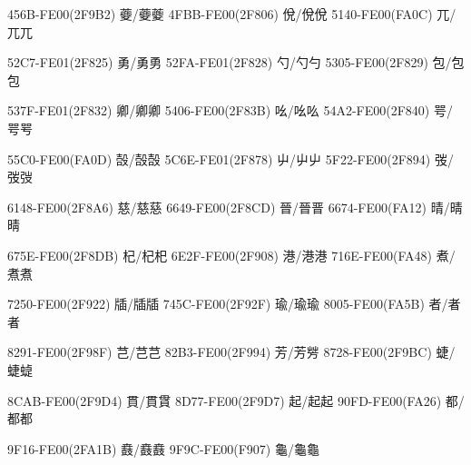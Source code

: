 456B-FE00(2F9B2) 䕫/䕫︀䕫 
4FBB-FE00(2F806) 侻/侻︀侻 
5140-FE00(FA0C) 兀/兀︀兀\par
52C7-FE01(2F825) 勇/勇︁勇 
52FA-FE01(2F828) 勺/勺︁勺 
5305-FE00(2F829) 包/包︀包\par
537F-FE01(2F832) 卿/卿︁卿 
5406-FE00(2F83B) 吆/吆︀吆 
54A2-FE00(2F840) 咢/咢︀咢\par
55C0-FE00(FA0D) 嗀/嗀︀嗀 
5C6E-FE01(2F878) 屮/屮︁屮 
5F22-FE00(2F894) 弢/弢︀弢\par
6148-FE00(2F8A6) 慈/慈︀慈 
6649-FE00(2F8CD) 晉/晉︀晉 
6674-FE00(FA12) 晴/晴︀晴\par
675E-FE00(2F8DB) 杞/杞︀杞 
6E2F-FE00(2F908) 港/港︀港 
716E-FE00(FA48) 煮/煮︀煮\par
7250-FE00(2F922) 牐/牐︀牐 
745C-FE00(2F92F) 瑜/瑜︀瑜 
8005-FE00(FA5B) 者/者︀者\par
8291-FE00(2F98F) 芑/芑︀芑 
82B3-FE00(2F994) 芳/芳︀芳 
8728-FE00(2F9BC) 蜨/蜨︀蜨\par
8CAB-FE00(2F9D4) 貫/貫︀貫 
8D77-FE00(2F9D7) 起/起︀起 
90FD-FE00(FA26) 都/都︀都\par
9F16-FE00(2FA1B) 鼖/鼖︀鼖 
9F9C-FE00(F907) 龜/龜︀龜 
